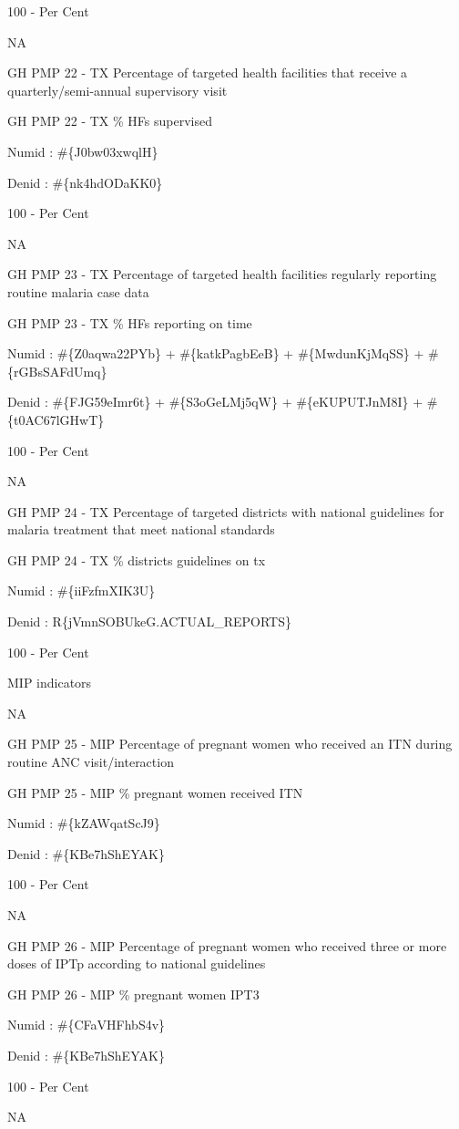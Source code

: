 \documentclass[]{book}
\begin{document}
100 - Per Cent

NA

GH PMP 22 - TX Percentage of targeted health facilities that receive a quarterly/semi-annual supervisory visit

GH PMP 22 - TX \% HFs supervised

Numid : \#\{J0bw03xwqlH\}

Denid : \#\{nk4hdODaKK0\}

100 - Per Cent

NA

GH PMP 23 - TX Percentage of targeted health facilities regularly reporting routine malaria case data

GH PMP 23 - TX \% HFs reporting on time

Numid : \#\{Z0aqwa22PYb\} + \#\{katkPagbEeB\} + \#\{MwdunKjMqSS\} + \#\{rGBsSAFdUmq\}

Denid : \#\{FJG59eImr6t\} + \#\{S3oGeLMj5qW\} + \#\{eKUPUTJnM8I\} + \#\{t0AC67lGHwT\}

100 - Per Cent

NA

GH PMP 24 - TX Percentage of targeted districts with national guidelines for malaria treatment that meet national standards

GH PMP 24 - TX \% districts guidelines on tx

Numid : \#\{iiFzfmXIK3U\}

Denid : R\{jVmnSOBUkeG.ACTUAL\_REPORTS\}

100 - Per Cent

MIP indicators

NA

GH PMP 25 - MIP Percentage of pregnant women who received an ITN during routine ANC visit/interaction

GH PMP 25 - MIP \% pregnant women received ITN

Numid : \#\{kZAWqatScJ9\}

Denid : \#\{KBe7hShEYAK\}

100 - Per Cent

NA

GH PMP 26 - MIP Percentage of pregnant women who received three or more doses of IPTp according to national guidelines

GH PMP 26 - MIP \% pregnant women IPT3

Numid : \#\{CFaVHFhbS4v\}

Denid : \#\{KBe7hShEYAK\}

100 - Per Cent

NA
\end{document}
